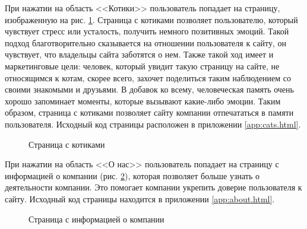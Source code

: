 \documentclass[a4paper, 14pt]{extarticle}
\begin{document}
При нажатии на область <<Котики>> пользователь попадает на страницу,
изображенную на рис. \ref{fig:cats}. Страница с котиками позволяет пользователю,
который чувствует стресс или усталость, получить немного позитивных эмоций.
Такой подход благотворительно сказывается на отношении пользователя к сайту, он
чувствует, что владельцы сайта заботятся о нем. Также такой ход имеет и
маркетинговые цели: человек, который увидит такую страницу на сайте, не
относящимся к котам, скорее всего, захочет поделиться таким наблюдением со
своими знакомыми и друзьями. В добавок ко всему, человеческая память очень
хорошо запоминает моменты, которые вызывают какие-либо эмоции. Таким образом,
страница с котиками позволяет сайту компании отпечататься в памяти пользователя.
Исходный код страницы расположен в приложении \ref{app:cats.html}.

\begin{figure}[H]
  \centering
  \caption{Страница с котиками}
  \label{fig:cats}
\end{figure}

При нажатии на область <<О нас>> пользователь попадает на страницу с информацией
о компании (рис. \ref{fig:about}), которая позволяет больше узнать о
деятельности компании. Это помогает компании укрепить доверие пользователя к
сайту. Исходный код страницы находится в приложении \ref{app:about.html}.

\begin{figure}[H]
  \centering
  \caption{Страница с информацией о компании}
  \label{fig:about}
\end{figure}
\end{document}
